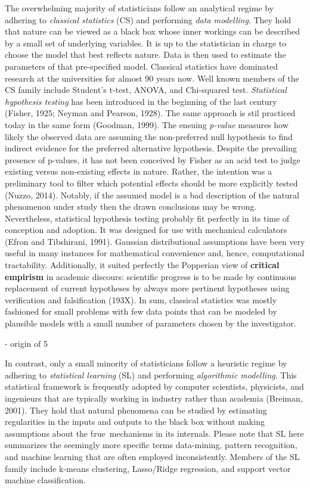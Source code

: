 \documentclass[authoryear,review,3p]{elsarticle}
\begin{document}
The overwhelming majority of statisticians
follow an analytical regime by
adhering to \textit{classical statistics} (CS) and performing
\textit{data modelling}. They hold that nature can be viewed as a black box
whose inner workings can be described by a small set of
underlying variables.
It is up to the statistician in charge
to choose the model that best reflects nature.
Data is then used to estimate the parameters of that pre-specified model.
Classical statistics have dominated research at the universities
for almost 90 years now.
Well known members of the CS family include Student's t-test, ANOVA,
and Chi-squared test.
\textit{Statistical hypothesis testing} has been introduced in the beginning
of the last century (Fisher, 1925; Neyman and Pearson, 1928).
The same approach is stil practiced today in the same form (Goodman, 1999).
%
The ensuing \textit{p-value} measures how likely the observed data
are assuming the non-preferred null hypothesis to find indirect evidence
for the preferred alternative hypothesis.
%
Despite the prevailing presence of p-values,
it has not been conceived by Fisher as an acid test
to judge existing versus non-existing effects in nature.
Rather, the intention was a preliminary tool to
filter which potential effects should be more explicitly tested (Nuzzo, 2014).
%
Notably, if the assumed model is a bad description of
the natural phenomenon under study
then the drawn conclusions may be wrong.
%
Nevertheless, statistical hypothesis testing probably fit perfectly
in its time of conception and adoption.
It was designed for use with mechanical calculators
(Efron and Tibshirani, 1991). Gaussian distributional assumptions
have been very useful in many instances for
mathematical convenience and, hence, computational tractability.
Additionally, it suited perfectly the Popperian view of
\textbf{critical empirism} in academic discours:
scientific progress is to be made by continuous replacement of current
hypotheses by always more pertinent hypotheses
using verification and falsification (193X).
%
In sum,
classical statistics was mostly fashioned
for small problems with few data points that can be modeled 
by plausible models with a small number of parameters chosen by the
investigator.
 


- origin of 5%


In contrast, only a small minority of statisticians
follow a heuristic regime by
adhering to \textit{statistical learning} (SL) and performing
\textit{algorithmic modelling}.
This statistical framework is frequently adopted by computer scientists,
physicists, and ingenieurs that are typically working in industry
rather than academia (Breiman, 2001).
They hold that natural phenomena
can be studied by estimating regularities in the inputs and
outputs to the black box without making assumptions
about the \"true\ mechanisms in its internals.
Please note that SL here summarizes the seemingly more specific terms data-mining, pattern recognition, and machine learning that are often employed inconsistently.
Members of
the SL family include k-means clustering,
Lasso/Ridge regression, and support vector machine classification.
\end{document}
